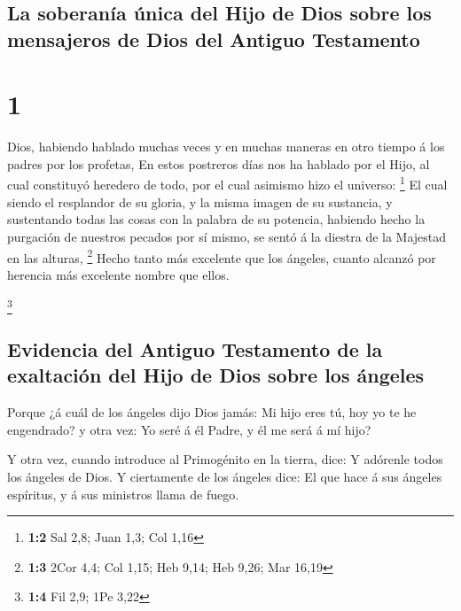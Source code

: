 \hypertarget{la-soberanuxeda-uxfanica-del-hijo-de-dios-sobre-los-mensajeros-de-dios-del-antiguo-testamento}{%
\subsection{La soberanía única del Hijo de Dios sobre los mensajeros de
Dios del Antiguo
Testamento}\label{la-soberanuxeda-uxfanica-del-hijo-de-dios-sobre-los-mensajeros-de-dios-del-antiguo-testamento}}

\hypertarget{section}{%
\section{1}\label{section}}

 Dios, habiendo hablado muchas veces y en muchas maneras en
otro tiempo á los padres por los profetas,  En estos
postreros días nos ha hablado por el Hijo, al cual constituyó heredero
de todo, por el cual asimismo hizo el universo: \footnote{\textbf{1:2}
  Sal 2,8; Juan 1,3; Col 1,16}  El cual siendo el resplandor
de su gloria, y la misma imagen de su sustancia, y sustentando todas las
cosas con la palabra de su potencia, habiendo hecho la purgación de
nuestros pecados por sí mismo, se sentó á la diestra de la Majestad en
las alturas, \footnote{\textbf{1:3} 2Cor 4,4; Col 1,15; Heb 9,14; Heb
  9,26; Mar 16,19}  Hecho tanto más excelente que los
ángeles, cuanto alcanzó por herencia más excelente nombre que ellos.

\footnote{\textbf{1:4} Fil 2,9; 1Pe 3,22}

\hypertarget{evidencia-del-antiguo-testamento-de-la-exaltaciuxf3n-del-hijo-de-dios-sobre-los-uxe1ngeles}{%
\subsection{Evidencia del Antiguo Testamento de la exaltación del Hijo
de Dios sobre los
ángeles}\label{evidencia-del-antiguo-testamento-de-la-exaltaciuxf3n-del-hijo-de-dios-sobre-los-uxe1ngeles}}

 Porque ¿á cuál de los ángeles dijo Dios jamás: Mi hijo eres
tú, hoy yo te he engendrado? y otra vez: Yo seré á él Padre, y él me
será á mí hijo?

 Y otra vez, cuando introduce al Primogénito en la tierra,
dice: Y adórenle todos los ángeles de Dios.  Y ciertamente
de los ángeles dice: El que hace á sus ángeles espíritus, y á sus
ministros llama de fuego.

